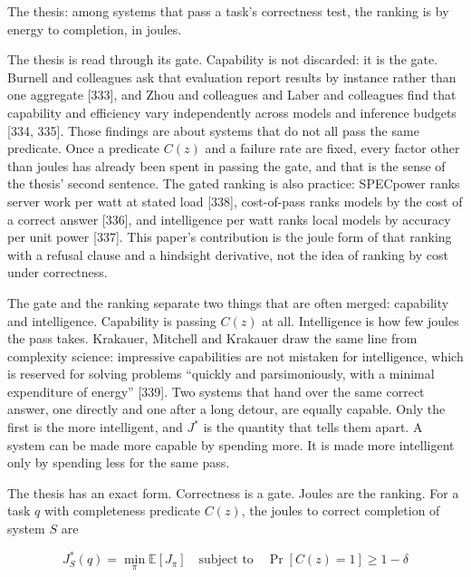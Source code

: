 \documentclass[
  10pt,
]{article}
\begin{document}
The thesis: among systems that pass a task's correctness test, the
ranking is by energy to completion, in joules.

The thesis is read through its gate. Capability is not discarded: it is
the gate. Burnell and colleagues ask that evaluation report results by
instance rather than one aggregate {[}333{]}, and Zhou and colleagues
and Laber and colleagues find that capability and efficiency vary
independently across models and inference budgets {[}334, 335{]}. Those
findings are about systems that do not all pass the same predicate. Once
a predicate \(C(z)\) and a failure rate are fixed, every factor other
than joules has already been spent in passing the gate, and that is the
sense of the thesis' second sentence. The gated ranking is also
practice: SPECpower ranks server work per watt at stated load {[}338{]},
cost-of-pass ranks models by the cost of a correct answer {[}336{]}, and
intelligence per watt ranks local models by accuracy per unit power
{[}337{]}. This paper's contribution is the joule form of that ranking
with a refusal clause and a hindsight derivative, not the idea of
ranking by cost under correctness.

The gate and the ranking separate two things that are often merged:
capability and intelligence. Capability is passing \(C(z)\) at all.
Intelligence is how few joules the pass takes. Krakauer, Mitchell and
Krakauer draw the same line from complexity science: impressive
capabilities are not mistaken for intelligence, which is reserved for
solving problems ``quickly and parsimoniously, with a minimal
expenditure of energy'' {[}339{]}. Two systems that hand over the same
correct answer, one directly and one after a long detour, are equally
capable. Only the first is the more intelligent, and \(J^*\) is the
quantity that tells them apart. A system can be made more capable by
spending more. It is made more intelligent only by spending less for the
same pass.

The thesis has an exact form. Correctness is a gate. Joules are the
ranking. For a task \(q\) with completeness predicate \(C(z)\), the
joules to correct completion of system \(S\) are

\[J^*_S(q) = \min_{\pi} \mathbb{E}[J_\pi] \quad \text{subject to} \quad \Pr[C(z) = 1] \ge 1 - \delta\]
\end{document}
